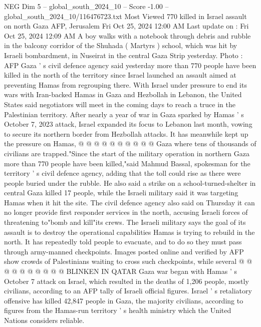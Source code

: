 \begin{textsample}{NEG Dim 5 – global\_south\_2024\_10 – Score -1.00 – global\_south\_2024\_10/116476723.txt}  \label{ex:f5_neg_135}
Most Viewed 770 killed in Israel assault on north Gaza AFP, Jerusalem Fri Oct 25, 2024 12:00 AM Last update on : Fri Oct 25, 2024 12:09 AM A boy walks with a notebook through debris and rubble in the balcony corridor of the Shuhada ( Martyrs ) school, which was hit by Israeli bombardment, in Nuseirat in the central Gaza Strip yesterday.
Photo : AFP Gaza ' s civil defence agency said yesterday more than 770 people have been killed in the north of the territory since Israel launched an assault aimed at preventing Hamas from regrouping there.
With Israel under pressure to end its wars with Iran-backed Hamas in Gaza and Hezbollah in Lebanon, the United States said negotiators will meet in the coming days to reach a truce in the Palestinian territory.
After nearly a year of war in Gaza sparked by Hamas ' s October 7, 2023 attack, Israel expanded its focus to Lebanon last month, vowing to secure its northern border from Hezbollah attacks.
It has meanwhile kept up the pressure on Hamas, @ @ @ @ @ @ @ @ @ @ Gaza where tens of thousands of civilians are trapped."Since the start of the military operation in northern Gaza more than 770 people have been killed,"said Mahmud Bassal, spokesman for the territory ' s civil defence agency, adding that the toll could rise as there were people buried under the rubble.
He also said a strike on a school-turned-shelter in central Gaza killed 17 people, while the Israeli military said it was targeting Hamas when it hit the site.
The civil defence agency also said on Thursday it can no longer provide first responder services in the north, accusing Israeli forces of threatening to"bomb and kill"its crews.
The Israeli military says the goal of its assault is to destroy the operational capabilities Hamas is trying to rebuild in the north.
It has repeatedly told people to evacuate, and to do so they must pass through army-manned checkpoints.
Images posted online and verified by AFP show crowds of Palestinians waiting to cross such checkpoints, while several @ @ @ @ @ @ @ @ @ @ BLINKEN IN QATAR Gaza war began with Hamas ' s October 7 attack on Israel, which resulted in the deaths of 1,206 people, mostly civilians, according to an AFP tally of Israeli official figures.
Israel ' s retaliatory offensive has killed 42,847 people in Gaza, the majority civilians, according to figures from the Hamas-run territory ' s health ministry which the United Nations considers reliable.

\end{textsample}
